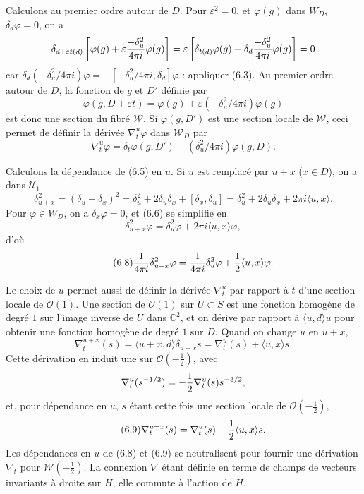 \documentclass[11pt]{article}
\newcommand{\C}{\mathbb C}
\newcommand{\cO}{\mathcal O}
\newcommand{\cW}{\mathcal W}
\newcommand{\half}{\tfrac12}
\begin{document}
Calculons au premier ordre autour de $D$. Pour $\varepsilon^2=0$, et $\varphi(g)$ dans $W_D$, $\delta_d\varphi=0$, on a
\[
\delta_{d+\varepsilon t(d)}\left[\varphi(g)+\varepsilon{-\delta_u^2\over4\pi i}\varphi(g)\right]
=\varepsilon\left[\delta_{t(d)}\varphi(g)+\delta_d{-\delta_u^2\over4\pi i}\varphi(g)\right]=0
\]
car $\delta_d(-\delta_u^2/4\pi i)\varphi=-[-\delta_u^2/4\pi i,\delta_d]\varphi$ : appliquer (6.3). Au premier ordre autour de $D$, la fonction de $g$ et $D'$ définie par
\[
\varphi(g,D+\varepsilon t)=\varphi(g)+\varepsilon(-\delta_u^2/4\pi i)\varphi(g)
\]
est donc une section du fibré $\cW$. Si $\varphi(g,D')$ est une section locale de $\cW$, ceci permet de définir la dérivée $\nabla_t^u\varphi$ dans $\cW_D$ par
\begin{equation}\tag{6.5}
\nabla_t^u\varphi=\delta_t\varphi(g,D')+(\delta_u^2/4\pi i)\varphi(g,D).
\end{equation}

Calculons la dépendance de (6.5) en $u$. Si $u$ est remplacé par $u+x$ ($x\in D$), on a dans $\mathcal U_1$
\begin{equation}\tag{6.6}
\delta_{u+x}^2=(\delta_u+\delta_x)^2=\delta_u^2+2\delta_u\delta_x+[\delta_x,\delta_u]
=\delta_u^2+2\delta_u\delta_x+2\pi i\langle u,x\rangle.
\end{equation}
Pour $\varphi\in W_D$, on a $\delta_x\varphi=0$, et (6.6) se simplifie en
\begin{equation}\tag{6.7}
\delta_{u+x}^2\varphi=\delta_u^2\varphi+2\pi i\langle u,x\rangle\varphi,
\end{equation}
d'où
\begin{equation}\tag{6.8}
{1\over4\pi i}\delta_{u+x}^2\varphi={1\over4\pi i}\delta_u^2\varphi+{1\over2}\langle u,x\rangle\varphi.
\end{equation}

Le choix de $u$ permet aussi de définir la dérivée $\nabla_t^u$ par rapport à $t$ d'une section locale de $\cO(1)$. Une section de $\cO(1)$ sur $U\subset S$ est une fonction homogène de degré $1$ sur l'image inverse de $U$ dans $\C^2$, et on dérive par rapport à $\langle u,d\rangle u$ pour obtenir une fonction homogène de degré $1$ sur $D$. Quand on change $u$ en $u+x$,
\[
\nabla_t^{u+x}(s)=\langle u+x,d\rangle\delta_{u+x}s=\nabla_t^u(s)+\langle u,x\rangle s.
\]
Cette dérivation en induit une sur $\cO(-\half)$, avec
\[
\nabla_t^u(s^{-1/2})=-{1\over2}\nabla_t^u(s)s^{-3/2},
\]
et, pour dépendance en $u$, $s$ étant cette fois une section locale de $\cO(-\half)$,
\begin{equation}\tag{6.9}
\nabla_t^{u+x}(s)=\nabla_t^u(s)-{1\over2}\langle u,x\rangle s.
\end{equation}
Les dépendances en $u$ de (6.8) et (6.9) se neutralisent pour fournir une dérivation $\nabla_t$ pour $\cW(-\half)$. La connexion $\nabla$ étant définie en terme de champs de vecteurs invariants à droite sur $H$, elle commute à l'action de $H$.
\end{document}
